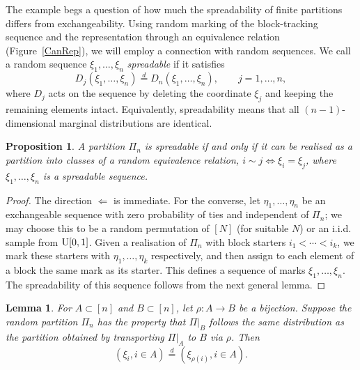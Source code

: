 \documentclass{article}
\newtheorem{lemma}{Lemma}
\newtheorem{proposition}{Proposition}
\begin{document}

\vskip0.2cm
The example begs a question of how much the spreadability of finite partitions differs from  exchangeability. Using random marking of the block-tracking sequence 
and the representation through an equivalence relation (Figure~\ref{CanRep}), 
we will employ a connection with random sequences. We call a random sequence $\xi_1,\ldots,\xi_n$ \emph{spreadable} if it satisfies 
\begin{equation}\label{SeqSpr}
D_j (\xi_1, \ldots, \xi_n) \stackrel{d}{=} D_n (\xi_1, \ldots, \xi_n), \qquad j = 1, \ldots, n,
\end{equation}
where $D_j$ acts on the sequence by deleting the coordinate $\xi_j$ and keeping the remaining elements intact.
Equivalently,  spreadability means that all $(n-1)$-dimensional marginal distributions are identical.



\begin{proposition}\label{Prs} 
A partition $\Pi_n$ is spreadable if and only if it can be realised as a partition into classes of a random 
equivalence relation, $i\sim j \Leftrightarrow \xi_i=\xi_j$, where $\xi_1,\ldots,\xi_n$ is a spreadable sequence.
\end{proposition}
\begin{proof}
The direction $\Leftarrow$ is immediate. 
For the converse, let $\eta_1,\ldots,\eta_n$ be an exchangeable sequence with zero probability of ties and independent of $\Pi_n$;
we may choose this to be a random permutation of $[N]$ (for suitable $N$) or an i.i.d. sample from ${\rm U}[0,1]$.
Given a realisation of $\Pi_n$ with block starters $i_1<\cdots<i_k$, we mark these starters with $\eta_1,\ldots,\eta_k$ respectively, and then assign to each element of a block the same mark as its starter. This defines a sequence of marks $\xi_1,\ldots,\xi_n$. The spreadability of this sequence follows from the next general lemma.
\end{proof}

\begin{lemma} \label{repLemma}
For $A\subset[n]$ and $B\subset[n]$, let $\rho: A\to B$ be a bijection. Suppose the random partition $\Pi_n$ has the property that $\Pi|_B$ follows the same distribution as the partition obtained by transporting $\Pi|_A$ to $B$ via $\rho$. Then 
$$(\xi_i, i\in A) \stackrel{d}{=} (\xi_{\rho(i)}, i\in A).$$
\end{lemma}
\end{document}
